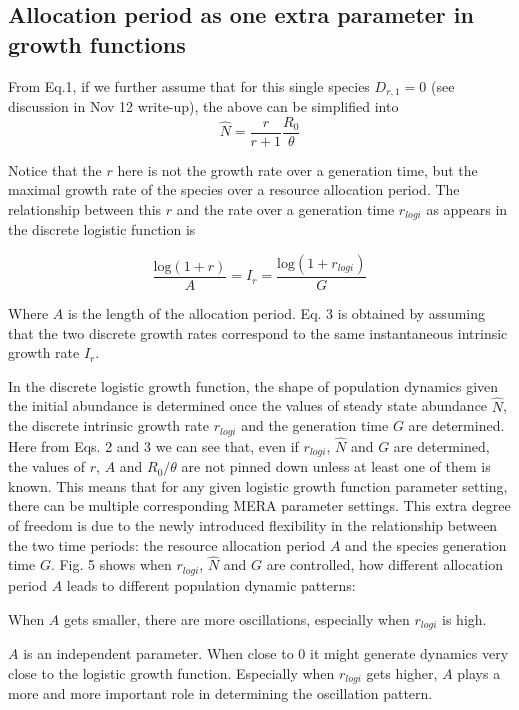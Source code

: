 \documentclass[12pt]{article}
\begin{document}
\subsection{Allocation period as one extra parameter in growth functions}

From Eq.1, if we further assume that for this single species $D_{r,1}=0$ (see discussion in Nov 12 write-up), the above can be simplified into 
   \begin{equation}
\hat{N} = \frac{r}{r+1}\frac{ R_0}{\theta} 
  \end{equation}

Notice that the $r$ here is not the growth rate over a generation time, but the maximal growth rate of the species over a resource allocation period. The relationship between this $r$ and the rate over a generation time $r_{logi}$ as appears in the discrete logistic function is

\begin{equation}
 \frac{ \mbox{log} (1+r) }{A} = I_r = \frac{ \mbox{log} (1+r_{logi}) }{G}
\end{equation}

Where $A$ is the length of the allocation period. Eq. 3 is obtained by assuming that the two discrete growth rates correspond to the same instantaneous intrinsic growth rate $I_r$. 

In the discrete logistic growth function, the shape of population dynamics given the initial abundance is determined once the values of steady state abundance $\hat{N}$, the discrete intrinsic growth rate $r_{logi}$ and the generation time $G$ are determined. Here from Eqs. 2 and 3 we can see that, even if $r_{logi}$, $\hat{N}$ and $G$ are determined, the values of $r$, $A$ and $R_0/\theta$ are not pinned down unless at least one of them is known. This means that for any given logistic growth function parameter setting, there can be multiple corresponding MERA parameter settings. This extra degree of freedom is due to the newly introduced flexibility in the relationship between the two time periods: the resource allocation period $A$ and the species generation time $G$. Fig. 5 shows when $r_{logi}$, $\hat{N}$ and $G$ are controlled, how different allocation period $A$ leads to different population dynamic patterns:


When $A$ gets smaller, there are more oscillations, especially when $r_{logi}$ is high. 

$A$ is an independent parameter. When close to 0 it might generate dynamics very close to the logistic growth function. Especially when $r_{logi}$ gets higher, $A$ plays a more and more important role in determining the oscillation pattern.
\end{document}
